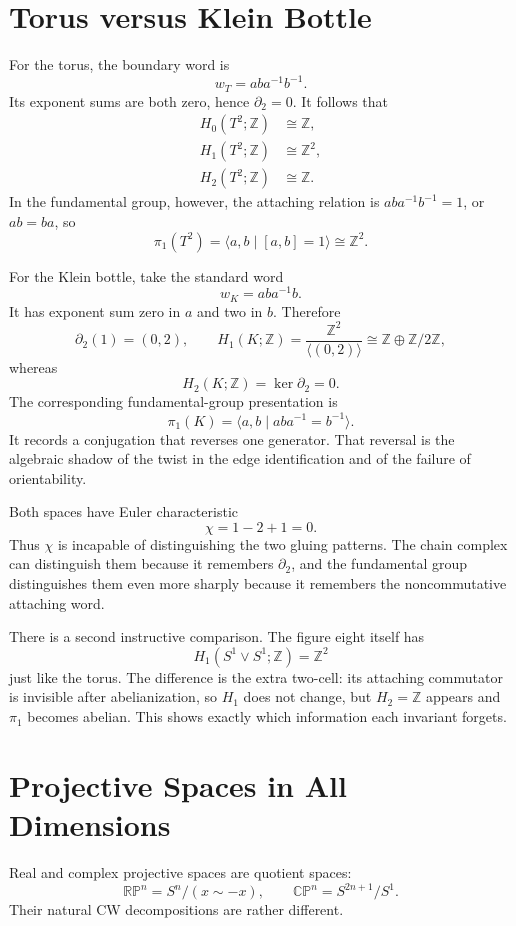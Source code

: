 \section{Torus versus Klein Bottle}

For the torus, the boundary word is
\[
 w_T=aba^{-1}b^{-1}.
\]
Its exponent sums are both zero, hence \(\partial_2=0\). It follows that
\[
 \begin{aligned}
 H_0(T^2;\mathbb Z)&\cong\mathbb Z,\\
 H_1(T^2;\mathbb Z)&\cong\mathbb Z^2,\\
 H_2(T^2;\mathbb Z)&\cong\mathbb Z.
 \end{aligned}
\]
In the fundamental group, however, the attaching relation is
\(aba^{-1}b^{-1}=1\), or \(ab=ba\), so
\[
 \pi_1(T^2)
 =\langle a,b\mid [a,b]=1\rangle
 \cong\mathbb Z^2.
\]

For the Klein bottle, take the standard word
\[
 w_K=aba^{-1}b.
\]
It has exponent sum zero in \(a\) and two in \(b\). Therefore
\[
 \partial_2(1)=(0,2),\qquad
 H_1(K;\mathbb Z)
 =\frac{\mathbb Z^2}{\langle(0,2)\rangle}
 \cong\mathbb Z\oplus\mathbb Z/2\mathbb Z,
\]
whereas
\[
 H_2(K;\mathbb Z)=\ker\partial_2=0.
\]
The corresponding fundamental-group presentation is
\[
 \pi_1(K)
 =\langle a,b\mid aba^{-1}=b^{-1}\rangle.
\]
It records a conjugation that reverses one generator. That reversal is the algebraic shadow of the twist in the edge identification and of the failure of orientability.

Both spaces have Euler characteristic
\[
 \chi=1-2+1=0.
\]
Thus \(\chi\) is incapable of distinguishing the two gluing patterns. The chain complex can distinguish them because it remembers \(\partial_2\), and the fundamental group distinguishes them even more sharply because it remembers the noncommutative attaching word.

There is a second instructive comparison. The figure eight itself has
\[
 H_1(S^1\vee S^1;\mathbb Z)=\mathbb Z^2
\]
just like the torus. The difference is the extra two-cell: its attaching commutator is invisible after abelianization, so \(H_1\) does not change, but \(H_2=\mathbb Z\) appears and \(\pi_1\) becomes abelian. This shows exactly which information each invariant forgets.

\section{Projective Spaces in All Dimensions}

Real and complex projective spaces are quotient spaces:
\[
 \mathbb{RP}^n=S^n/(x\sim-x),\qquad
 \mathbb{CP}^n=S^{2n+1}/S^1.
\]
Their natural CW decompositions are rather different.

